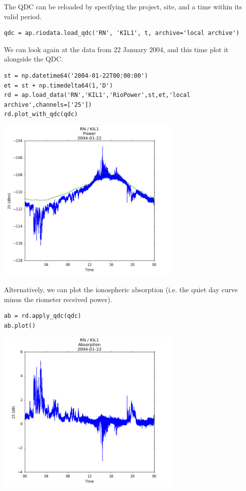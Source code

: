\documentclass{article}
\begin{document}
The QDC can be reloaded by specifying the project, site, and a time within its valid period.

\begin{lstlisting}[style=pythonstyle]
qdc = ap.riodata.load_qdc('RN', 'KIL1', t, archive='local archive')
\end{lstlisting}

We can look again at the data from 22 January 2004, and this time plot it alongside the QDC.

\begin{lstlisting}[style=pythonstyle]
st = np.datetime64('2004-01-22T00:00:00')
et = st + np.timedelta64(1,'D')
rd = ap.load_data('RN','KIL1','RioPower',st,et,'local archive',channels=['25'])
rd.plot_with_qdc(qdc)
\end{lstlisting}

\begin{center}
\includegraphics[width=9cm]{images/figure_4.png}
\end{center}


\noindent Alternatively, we can plot the ionospheric absorption (i.e. the quiet day curve minus the riometer received power).
\begin{lstlisting}[style=pythonstyle]
ab = rd.apply_qdc(qdc)
ab.plot()
\end{lstlisting}

\begin{center}
\includegraphics[width=9cm]{images/figure_5.png}
\end{center}
\end{document}
